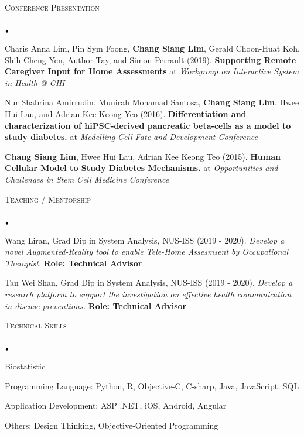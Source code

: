 \documentclass[11pt]{article}
\newcommand{\lineunder}{\vspace*{-8pt} \\ \hspace*{-18pt} \hrulefill \\}
\newcommand{\header}[1]{{\hspace*{-15pt}\vspace*{6pt} \textsc{#1}} \vspace*{-6pt} \lineunder}
\newcommand{\lbt}{\,\begin{picture}(-1,1)(-1,-3)\circle*{3}\end{picture}\ }
\newenvironment{achievements}{
    \begin{list}{$\lbt$}{
        \topsep 0pt
        \itemsep 0pt
        \addtolength{\leftmargin}{-0.1in}
    }
}
{
    \vspace*{4pt}
    \end{list}
}
\begin{document}
\header{Conference Presentation}
\vspace*{2mm}
\begin{achievements}
\justifying
\item Charis Anna Lim, Pin Sym Foong, \textbf{Chang Siang Lim}, Gerald Choon-Huat Koh, Shih-Cheng Yen, Author Tay, and Simon Perrault
(2019). \textbf{Supporting Remote Caregiver Input for Home Assessments} at 
\textit{Workgroup on Interactive System in Health @ CHI}
\item Nur Shabrina Amirrudin, Munirah Mohamad Santosa, \textbf{Chang Siang Lim}, 
Hwee Hui Lau, and Adrian Kee Keong Yeo (2016). 
\textbf{Differentiation and characterization of hiPSC-derived pancreatic beta-cells as a model 
to study diabetes.} at \textit{Modelling Cell Fate and Development Conference}
\item \textbf{Chang Siang Lim}, Hwee Hui Lau, Adrian Kee Keong Teo (2015). 
\textbf{Human Cellular Model to Study Diabetes Mechanisms.} at 
\textit{Opportunities and Challenges in Stem Cell Medicine Conference}
\end{achievements}
\hfill{}

\header{Teaching / Mentorship}
\vspace{2mm}
\begin{achievements}
\justifying
\item Wang Liran, Grad Dip in System Analysis, NUS-ISS (2019 - 2020). 
\textit{Develop a novel Augmented-Reality tool to enable Tele-Home Assesmsent by Occupational Therapist.}
\textbf{Role: Technical Advisor}
\item Tan Wei Shan, Grad Dip in System Analysis, NUS-ISS (2019 - 2020).
\textit{Develop a research platform to support the investigation on effective health communication in disease preventions.}
\textbf{Role: Technical Advisor}
\end{achievements}
\hfill{}

\header{Technical Skills}
\vspace{2mm}
\begin{achievements}
\justifying
\item Biostatistic
\item Programming Language: Python, R, Objective-C, C-sharp, Java, JavaScript, SQL
\item Application Development: ASP .NET, iOS, Android, Angular
\item Others: Design Thinking, Objective-Oriented Programming
\end{achievements}
\hfill{}
\end{document}
